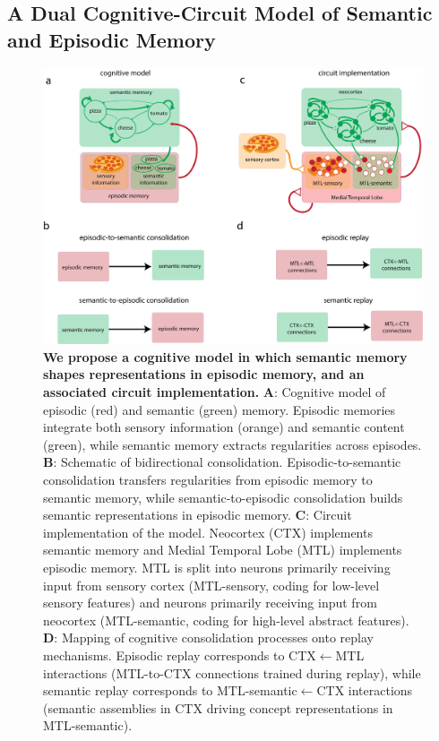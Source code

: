 \documentclass{article}
\begin{document}
\subsection*{A Dual Cognitive-Circuit Model of Semantic and Episodic Memory}
\begin{figure}[h!]
    \centering
    \includegraphics[width=\linewidth]{Figures/Figure_1.png}
    \caption{\textbf{We propose a cognitive model in which semantic memory shapes representations in episodic memory, and an associated circuit implementation.} \textbf{A}: Cognitive model of episodic (red) and semantic (green) memory. Episodic memories integrate both sensory information (orange) and semantic content (green), while semantic memory extracts regularities across episodes. 
\textbf{B}: Schematic of bidirectional consolidation. Episodic-to-semantic consolidation transfers regularities from episodic memory to semantic memory, while semantic-to-episodic consolidation builds semantic representations in episodic memory.  
\textbf{C}: Circuit implementation of the model. Neocortex (CTX) implements semantic memory and Medial Temporal Lobe (MTL) implements episodic memory. MTL is split into neurons primarily receiving input from sensory cortex (MTL-sensory, coding for low-level sensory features) and neurons primarily receiving input from neocortex (MTL-semantic, coding for high-level abstract features). 
\textbf{D}: Mapping of cognitive consolidation processes onto replay mechanisms. Episodic replay corresponds to CTX$\leftarrow$MTL interactions (MTL-to-CTX connections trained during replay), while semantic replay corresponds to MTL-semantic$\leftarrow$CTX interactions (semantic assemblies in CTX driving concept representations in MTL-semantic).}
    \label{fig:diagram}
\end{figure}
\end{document}

